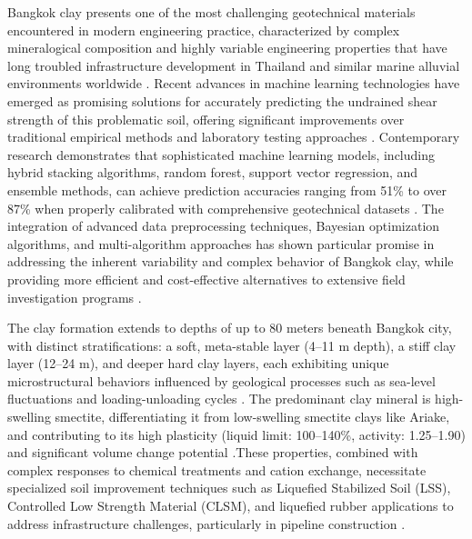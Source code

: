 \documentclass[12pt,a4paper]{article}
\begin{document}
	Bangkok clay presents one of the most challenging geotechnical materials encountered in modern engineering practice, characterized by complex mineralogical composition and highly variable engineering properties that have long troubled infrastructure development in Thailand and similar marine alluvial environments worldwide \cite{phai2019,Pithan_Pairojn_2020}. Recent advances in machine learning technologies have emerged as promising solutions for accurately predicting the undrained shear strength of this problematic soil, offering significant improvements over traditional empirical methods and laboratory testing approaches \cite{app121910177,Demir_Sahin_2024,doi:10.1177/03611981241278354}. Contemporary research demonstrates that sophisticated machine learning models, including hybrid stacking algorithms, random forest, support vector regression, and ensemble methods, can achieve prediction accuracies ranging from 51\% to over 87\% when properly calibrated with comprehensive geotechnical datasets \cite{Demir_Sahin_2024,doi:10.1177/03611981241278354,su12062218}. The integration of advanced data preprocessing techniques, Bayesian optimization algorithms, and multi-algorithm approaches has shown particular promise in addressing the inherent variability and complex behavior of Bangkok clay, while providing more efficient and cost-effective alternatives to extensive field investigation programs \cite{Demir_Sahin_2024,doi:10.1177/03611981241278354,app13095418}.
	
	The clay formation extends to depths of up to 80 meters beneath Bangkok city, with distinct stratifications: a soft, meta-stable layer (4–11 m depth), a stiff clay layer (12–24 m), and deeper hard clay layers, each exhibiting unique microstructural behaviors influenced by geological processes such as sea-level fluctuations and loading-unloading cycles \cite{Krit_Saowiang_Pham_Huy_Giao_2019}. The predominant clay mineral is high-swelling smectite, differentiating it from low-swelling smectite clays like Ariake, and contributing to its high plasticity (liquid limit: 100–140\%, activity: 1.25–1.90) and significant volume change potential \cite{OHTSUBO200011}.These properties, combined with complex responses to chemical treatments and cation exchange, necessitate specialized soil improvement techniques such as Liquefied Stabilized Soil (LSS), Controlled Low Strength Material (CLSM), and liquefied rubber applications to address infrastructure challenges, particularly in pipeline construction \cite{Prum_Jumnongpol_Eamchotchawalit_Kantiwattanakul_Sooksatra_Jarearnsiri_Passananon_2019}.
	
\end{document}
